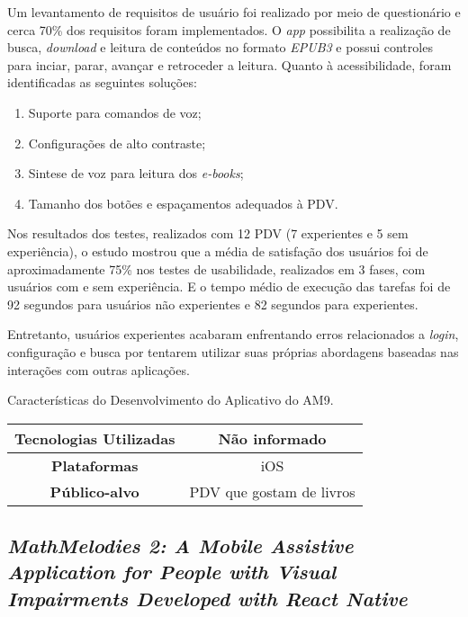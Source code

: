 Um levantamento de requisitos de usuário foi realizado por meio de questionário e cerca 70\% dos requisitos foram implementados.
O \emph{app} possibilita a realização de busca, \emph{download} e leitura de conteúdos no formato \emph{EPUB3} e possui controles para inciar, parar, avançar e retroceder a leitura.
Quanto à acessibilidade, foram identificadas as seguintes soluções:

\begin{enumerate}
  \item Suporte para comandos de voz;
  \item Configurações de alto contraste;
  \item Sintese de voz para leitura dos \emph{e-books};
  \item Tamanho dos botões e espaçamentos adequados à PDV\@.
\end{enumerate}

Nos resultados dos testes, realizados com 12 PDV (7 experientes e 5 sem experiência), o estudo mostrou que a média de satisfação
dos usuários foi de aproximadamente 75\% nos testes de usabilidade, realizados em 3 fases, com usuários com e sem experiência.
E o tempo médio de execução das tarefas foi de 92 segundos para usuários não experientes e 82 segundos para experientes.

Entretanto, usuários experientes acabaram enfrentando erros relacionados a \emph{login}, configuração e busca por tentarem
utilizar suas próprias abordagens baseadas nas interações com outras aplicações.

\begin{quadro}[htb!]
  \caption{\label{qua-car-am9}Características do Desenvolvimento do Aplicativo do AM9.}
  \begin{tabular}{|c|c|}
    \hline
    \textbf{Tecnologias Utilizadas} & Não informado            \\ \hline
    \textbf{Plataformas}            & iOS                      \\ \hline
    \textbf{Público-alvo}           & PDV que gostam de livros \\
    \hline
  \end{tabular}
\end{quadro}

\subsection{\emph{MathMelodies 2: A Mobile Assistive Application for People with Visual Impairments Developed with React Native}}

